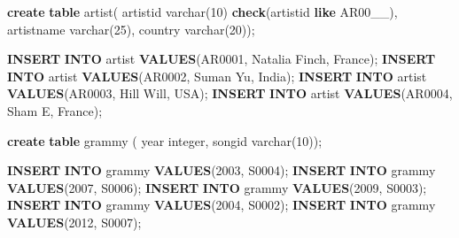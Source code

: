 \documentclass[
]{article}
\newenvironment{Shaded}{}{}
\newcommand{\DataTypeTok}[1]{\textcolor[rgb]{0.56,0.13,0.00}{#1}}
\newcommand{\DecValTok}[1]{\textcolor[rgb]{0.25,0.63,0.44}{#1}}
\newcommand{\KeywordTok}[1]{\textcolor[rgb]{0.00,0.44,0.13}{\textbf{#1}}}
\newcommand{\NormalTok}[1]{#1}
\newcommand{\StringTok}[1]{\textcolor[rgb]{0.25,0.44,0.63}{#1}}
\begin{document}
\begin{Shaded}
\begin{Highlighting}[]
\KeywordTok{create} \KeywordTok{table}\NormalTok{ artist(}
\NormalTok{   artistid }\DataTypeTok{varchar}\NormalTok{(}\DecValTok{10}\NormalTok{) }\KeywordTok{check}\NormalTok{(artistid }\KeywordTok{like} \StringTok{\textquotesingle{}AR00\_\_\textquotesingle{}}\NormalTok{),}
\NormalTok{   artistname }\DataTypeTok{varchar}\NormalTok{(}\DecValTok{25}\NormalTok{),}
\NormalTok{   country }\DataTypeTok{varchar}\NormalTok{(}\DecValTok{20}\NormalTok{));}

\KeywordTok{INSERT} \KeywordTok{INTO}\NormalTok{ artist }\KeywordTok{VALUES}\NormalTok{(}\StringTok{\textquotesingle{}AR0001\textquotesingle{}}\NormalTok{, }\StringTok{\textquotesingle{}Natalia Finch\textquotesingle{}}\NormalTok{, }\StringTok{\textquotesingle{}France\textquotesingle{}}\NormalTok{);}
\KeywordTok{INSERT} \KeywordTok{INTO}\NormalTok{ artist }\KeywordTok{VALUES}\NormalTok{(}\StringTok{\textquotesingle{}AR0002\textquotesingle{}}\NormalTok{, }\StringTok{\textquotesingle{}Suman Yu\textquotesingle{}}\NormalTok{, }\StringTok{\textquotesingle{}India\textquotesingle{}}\NormalTok{);}
\KeywordTok{INSERT} \KeywordTok{INTO}\NormalTok{ artist }\KeywordTok{VALUES}\NormalTok{(}\StringTok{\textquotesingle{}AR0003\textquotesingle{}}\NormalTok{, }\StringTok{\textquotesingle{}Hill Will\textquotesingle{}}\NormalTok{, }\StringTok{\textquotesingle{}USA\textquotesingle{}}\NormalTok{);}
\KeywordTok{INSERT} \KeywordTok{INTO}\NormalTok{ artist }\KeywordTok{VALUES}\NormalTok{(}\StringTok{\textquotesingle{}AR0004\textquotesingle{}}\NormalTok{, }\StringTok{\textquotesingle{}Sham E\textquotesingle{}}\NormalTok{, }\StringTok{\textquotesingle{}France\textquotesingle{}}\NormalTok{);}

\KeywordTok{create} \KeywordTok{table}\NormalTok{ grammy (}
   \DataTypeTok{year} \DataTypeTok{integer}\NormalTok{, songid }\DataTypeTok{varchar}\NormalTok{(}\DecValTok{10}\NormalTok{));}

\KeywordTok{INSERT} \KeywordTok{INTO}\NormalTok{ grammy }\KeywordTok{VALUES}\NormalTok{(}\DecValTok{2003}\NormalTok{, }\StringTok{\textquotesingle{}S0004\textquotesingle{}}\NormalTok{);}
\KeywordTok{INSERT} \KeywordTok{INTO}\NormalTok{ grammy }\KeywordTok{VALUES}\NormalTok{(}\DecValTok{2007}\NormalTok{, }\StringTok{\textquotesingle{}S0006\textquotesingle{}}\NormalTok{);}
\KeywordTok{INSERT} \KeywordTok{INTO}\NormalTok{ grammy }\KeywordTok{VALUES}\NormalTok{(}\DecValTok{2009}\NormalTok{, }\StringTok{\textquotesingle{}S0003\textquotesingle{}}\NormalTok{);}
\KeywordTok{INSERT} \KeywordTok{INTO}\NormalTok{ grammy }\KeywordTok{VALUES}\NormalTok{(}\DecValTok{2004}\NormalTok{, }\StringTok{\textquotesingle{}S0002\textquotesingle{}}\NormalTok{);}
\KeywordTok{INSERT} \KeywordTok{INTO}\NormalTok{ grammy }\KeywordTok{VALUES}\NormalTok{(}\DecValTok{2012}\NormalTok{, }\StringTok{\textquotesingle{}S0007\textquotesingle{}}\NormalTok{);}
\end{Highlighting}
\end{Shaded}
\end{document}
